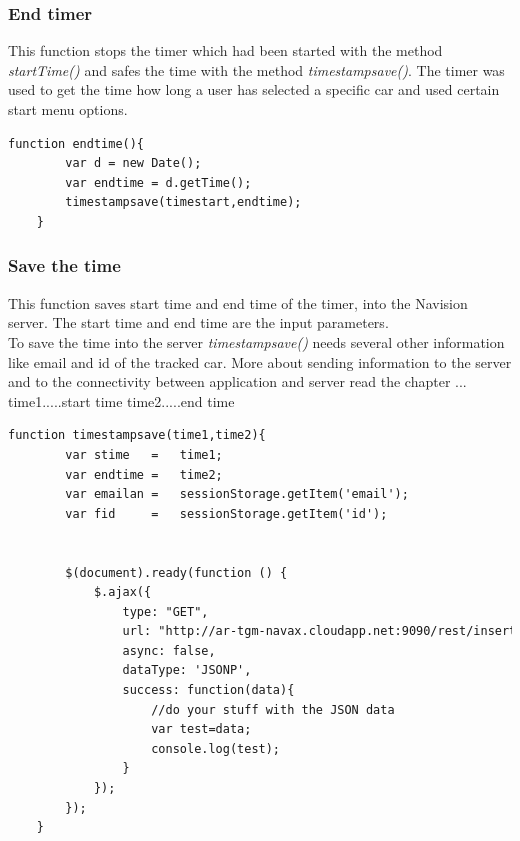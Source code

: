 \subsubsection{End timer}
This function stops the timer which had been started with the method \textit{startTime()} and safes the time with the method \textit{timestampsave()}. The timer was used to get the time how long a user has selected a specific car and used certain start menu options.
\\

\begin{lstlisting}[language=html, caption= 
End timer function,captionpos=b]
function endtime(){
        var d = new Date();
        var endtime = d.getTime();
        timestampsave(timestart,endtime);
    }
\end{lstlisting}


\subsubsection{Save the time}
This function saves start time and end time of the timer, into the Navision server. The start time and end time are the input parameters. 
\\


To save the time into the server \textit{timestampsave()} needs several other information like email and id of the tracked car. More about sending information to the server and  to the connectivity between application and server read the chapter ...
\\

time1.....start time
time2.....end time
\\

\begin{lstlisting}[language=html, caption= 
Save time function,captionpos=b]
function timestampsave(time1,time2){
        var stime	= 	time1;
        var endtime	=	time2;
        var emailan = 	sessionStorage.getItem('email');
        var fid 	= 	sessionStorage.getItem('id');
        

        $(document).ready(function () {
            $.ajax({
                type: "GET",
                url: "http://ar-tgm-navax.cloudapp.net:9090/rest/insertTrackingHistory/"+emailan+"/"+fid+"/"+stime+"/"+endtime+"/ac73f229f1fb88a8719e5f6d295bee45?callback=?",
                async: false,
                dataType: 'JSONP',
                success: function(data){
                    //do your stuff with the JSON data
                    var test=data;
                    console.log(test);
                }
            });
        });
    }
\end{lstlisting}


